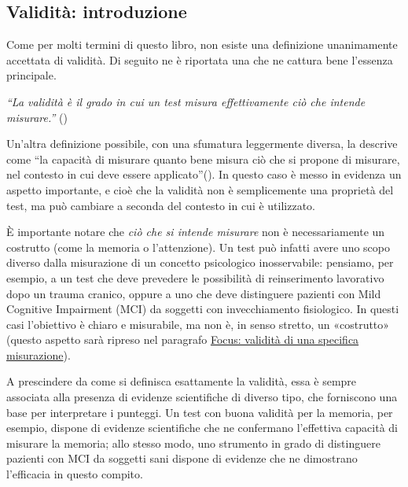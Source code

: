 \documentclass[
  italian,
  letterpaper,
  paper=A4,
  headinclude=on,
  footinclude=on,
  12pt]{scrbook}
\begin{document}
\subsection{Validità: introduzione}\label{validituxe0-introduzione}

Come per molti termini di questo libro, non esiste una definizione
unanimamente accettata di validità. Di seguito ne è riportata una che ne
cattura bene l'essenza principale.

\begin{tcolorbox}[enhanced jigsaw, left=2mm, colbacktitle=quarto-callout-note-color!10!white, bottomrule=.15mm, opacityback=0, coltitle=black, colframe=quarto-callout-note-color-frame, opacitybacktitle=0.6, leftrule=.75mm, colback=white, toprule=.15mm, title=\textcolor{quarto-callout-note-color}{\faInfo}\hspace{0.5em}{Definizione}, titlerule=0mm, arc=.35mm, breakable, rightrule=.15mm, bottomtitle=1mm, toptitle=1mm]

\emph{``La validità è il grado in cui un test misura effettivamente ciò
che intende misurare.''} (\cite{slick2006psychometrics})

\end{tcolorbox}

Un'altra definizione possibile, con una sfumatura leggermente diversa,
la descrive come ``la capacità di misurare quanto bene misura ciò che si
propone di misurare, nel contesto in cui deve essere
applicato''(\cite{nunnally1994psychometric}). In questo caso è messo in
evidenza un aspetto importante, e cioè che la validità non è
semplicemente una proprietà del test, ma può cambiare a seconda del
contesto in cui è utilizzato.

È importante notare che \emph{ciò che si intende misurare} non è
necessariamente un costrutto (come la memoria o l'attenzione). Un test
può infatti avere uno scopo diverso dalla misurazione di un concetto
psicologico inosservabile: pensiamo, per esempio, a un test che deve
prevedere le possibilità di reinserimento lavorativo dopo un trauma
cranico, oppure a uno che deve distinguere pazienti con Mild Cognitive
Impairment (MCI) da soggetti con invecchiamento fisiologico. In questi
casi l'obiettivo è chiaro e misurabile, ma non è, in senso stretto, un
«costrutto» (questo aspetto sarà ripreso nel paragrafo
\hyperref[focus-validituxe0-misurazione]{Focus: validità di una
specifica misurazione}).

A prescindere da come si definisca esattamente la validità, essa è
sempre associata alla presenza di evidenze scientifiche di diverso tipo,
che forniscono una base per interpretare i punteggi. Un test con buona
validità per la memoria, per esempio, dispone di evidenze scientifiche
che ne confermano l'effettiva capacità di misurare la memoria; allo
stesso modo, uno strumento in grado di distinguere pazienti con MCI da
soggetti sani dispone di evidenze che ne dimostrano l'efficacia in
questo compito.
\end{document}
